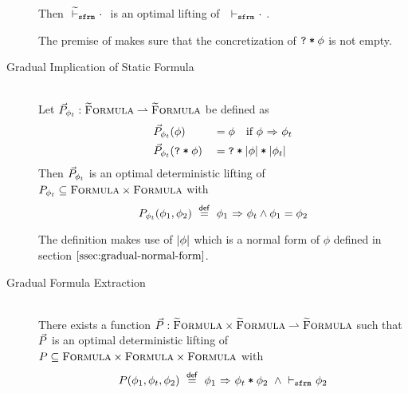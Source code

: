 \begin{description}
\begin{lemma}
        Then $~{\widetilde{\vdash}_\texttt{sfrm}}\,\, \cdot~$ is an optimal lifting of $~\,\,{\vdash_\texttt{sfrm}}\,\, \cdot~$.
    \end{lemma}
    The premise of  makes sure that the concretization of $\textup{\texttt{\textup{\texttt{?}}\:*\:\ensuremath{\phi}}}$ is not empty.
    
    \item[Gradual Implication of Static Formula]
    \begin{lemma}\label{lemma:impl-gimpl}~\\
        Let $\vec{P}_{\phi_t} : \textup{\textsc{\ensuremath{\widetilde{\text{F}}}ormula}} \rightharpoonup \textup{\textsc{\ensuremath{\widetilde{\text{F}}}ormula}}$ be defined as
        \begin{alignat*}{2}
        & \vec{P}_{\phi_t}(\phi)          & &= \phi  \quad\text{if } {\phi} \,\,{\Rightarrow}\,\, {\phi_t} \\
        & \vec{P}_{\phi_t}(\textup{\texttt{\textup{\texttt{?}}\:*\:\ensuremath{\phi}}}) & &= \textup{\texttt{\textup{\texttt{?}}\:*\:\ensuremath{\textup{\texttt{\ensuremath{|\phi|}\:*\:\ensuremath{|\phi_t|}}}}}}
        \end{alignat*}
        Then $\vec{P}_{\phi_t}$ is an optimal deterministic lifting of $P_{\phi_t} \subseteq \textup{\textsc{Formula}} \times \textup{\textsc{Formula}}$ with
        $$P_{\phi_t}(\phi_1, \phi_2) ~\overset{\textup{\textmd{\textsf{def}}}}{=}~ {\phi_1} \,\,{\Rightarrow}\,\, {\phi_t} \wedge \phi_1 = \phi_2$$
    \end{lemma}
    The definition makes use of $|\phi|$ which is a normal form of $\phi$ defined in section $\ref{ssec:gradual-normal-form}$.
    
    \item[Gradual Formula Extraction]
    \begin{lemma}~\\
        There exists a function $\vec{P} : \textup{\textsc{\ensuremath{\widetilde{\text{F}}}ormula}} \times \textup{\textsc{\ensuremath{\widetilde{\text{F}}}ormula}} \rightharpoonup \textup{\textsc{\ensuremath{\widetilde{\text{F}}}ormula}}$ such that
        $\vec{P}$ is an optimal deterministic lifting of $P \subseteq \textup{\textsc{Formula}} \times \textup{\textsc{Formula}} \times \textup{\textsc{Formula}}$ with
        $$P(\phi_1, \phi_t, \phi_2) ~\overset{\textup{\textmd{\textsf{def}}}}{=}~ {\phi_1} \,\,{\Rightarrow}\,\, {\textup{\texttt{$\phi_t$\:*\:$\phi_2$}}} ~\wedge \,\,{\vdash_\texttt{sfrm}}\,\, \phi_2$$
    \end{lemma}
    
    \begin{comment}
    Formula extraction is dual to the separating conjunction in a sense that it weakens given formula $\phi_1$ enough (yielding formula $\phi_2$) such that $\phiImplies{\phi_1}{\phiCons{$\phi_t$}{$\phi_2$}}$ holds for some $\phi_r$.\\
    Note that this operation requires that $\phiImplies{\phi_1}{\phi_t}$ holds, otherwise it is undefined.
    
    The operation would have no meaning in a classical setting because $\phiImplies{\phi_1}{\phiAnd{$\phi_t$}{$\phi_1$}}$ holds, i.e. $\phi_1$ does not require any weakening in order to be implied together with another conjunctive term.
    However the linear nature of implicit dynamic frames requires that $\phi_2$ and $\phi_t$ give access to disjoint memory locations.
    \end{comment}
    

\end{description}
